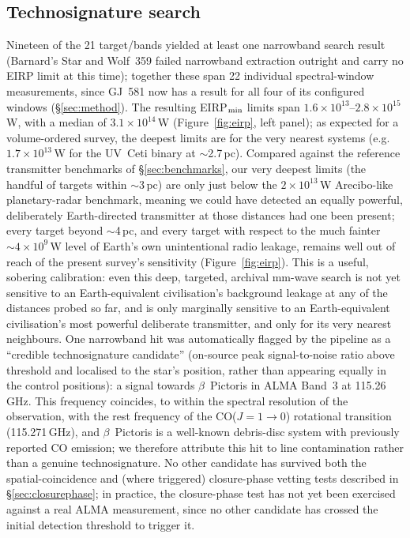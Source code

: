 \documentclass{openjournal}
\begin{document}
\subsection{Technosignature search}

Nineteen of the 21 target/bands yielded at least one narrowband search
result (Barnard's Star and Wolf~359 failed narrowband extraction
outright and carry no EIRP limit at this time); together these span 22
individual spectral-window measurements, since GJ~581 now has a result
for all four of its configured windows (\S\ref{sec:method}). The
resulting EIRP$_{\rm min}$ limits span
$1.6\times10^{13}$--$2.8\times10^{15}$\,W, with a median of
$3.1\times10^{14}$\,W (Figure~\ref{fig:eirp}, left panel); as expected
for a volume-ordered survey, the deepest limits are for the very nearest
systems (e.g.\ $1.7\times10^{13}$\,W for the UV~Ceti binary at $\sim$2.7\,pc).
Compared against the reference transmitter benchmarks of
\S\ref{sec:benchmarks}, our very deepest limits (the handful of targets
within $\sim$3\,pc) are only just below the $2\times10^{13}$\,W
Arecibo-like planetary-radar benchmark, meaning we could have detected an
equally powerful, deliberately Earth-directed transmitter at those
distances had one been present; every target beyond $\sim$4\,pc, and
every target with respect to the much fainter $\sim4\times10^{9}$\,W
level of Earth's own unintentional radio leakage, remains well out of
reach of the present survey's sensitivity (Figure~\ref{fig:eirp}). This
is a useful, sobering calibration: even this deep, targeted, archival
mm-wave search is not yet sensitive to an Earth-equivalent civilisation's
background leakage at any of the distances probed so far, and is only
marginally sensitive to an Earth-equivalent civilisation's most powerful
deliberate transmitter, and only for its very nearest neighbours.
One narrowband hit was automatically flagged by the pipeline as a
``credible technosignature candidate'' (on-source peak signal-to-noise
ratio above threshold and localised to the star's position, rather than
appearing equally in the control positions): a signal towards $\beta$~Pictoris
in ALMA Band~3 at 115.26\,GHz. This frequency coincides, to within the
spectral resolution of the observation, with the rest frequency of the
CO($J=1\to0$) rotational transition (115.271\,GHz), and $\beta$~Pictoris
is a well-known debris-disc system with previously reported CO emission;
we therefore attribute this hit to line contamination rather than a
genuine technosignature. No other candidate has survived both the
spatial-coincidence and (where triggered) closure-phase vetting tests
described in \S\ref{sec:closurephase}; in practice, the closure-phase test
has not yet been exercised against a real ALMA measurement, since no
other candidate has crossed the initial detection threshold to trigger it.
\end{document}
